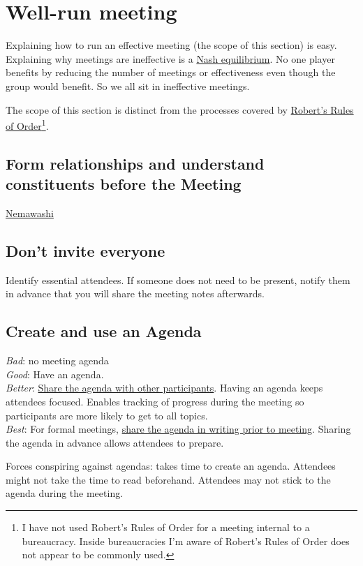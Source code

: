 \section{Well-run meeting\label{well-run_meeting}}

Explaining how to run an effective meeting (the scope of this section) is easy. Explaining why meetings are ineffective is a \href{https://en.wikipedia.org/wiki/Nash_equilibrium}{Nash equilibrium}. No one player benefits by reducing the number of meetings or effectiveness even though the group would benefit. So we all sit in ineffective meetings. 

The scope of this section is distinct from the processes covered by \href{https://en.wikipedia.org/wiki/Robert\%27s_Rules_of_Order}{Robert's Rules of Order}\footnote{I have not used Robert's Rules of Order for a meeting internal to a bureaucracy. Inside bureaucracies I'm aware of Robert's Rules of Order does not appear to be commonly used.}. 

\subsection*{Form relationships and understand constituents before the Meeting}

\href{https://en.wikipedia.org/wiki/Nemawashi}{Nemawashi}

\subsection*{Don't invite everyone}
Identify essential attendees. If someone does not need to be present, notify them in advance that you will share the meeting notes afterwards. 

\subsection*{Create and use an Agenda}
\textit{Bad}: no meeting agenda\\
\textit{Good}: Have an agenda. \\
\textit{Better}: \underline{Share the agenda with other participants}. Having an agenda keeps attendees focused.  Enables tracking of progress during the meeting so participants are more likely to get to all topics.\\
\textit{Best}: For formal meetings, \underline{share the agenda in writing prior to meeting}. Sharing the agenda in advance allows attendees to prepare.

Forces conspiring against agendas: takes time to create an agenda. Attendees might not take the time to read beforehand. Attendees may not stick to the agenda during the meeting.

